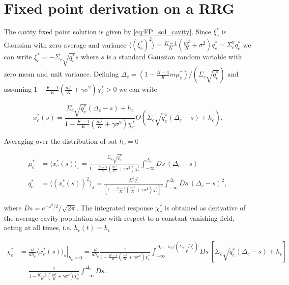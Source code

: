 \documentclass[
    preprint,
    linenumbers,
    amsmath,amssymb,amsfonts,
    aps, physrev,
    superscriptaddress,
    10pt,
    bibnotes
    ]{revtex4-2}
\begin{document}
\section{\label{sec:FP_RRG}Fixed point derivation on a RRG}

The cavity fixed point solution is given by \eqref{eq:FP_sol_cavity}.
Since $\xi_{c}^{*}$ is Gaussian with zero average and variance $\langle\left(\xi_{c}^{*}\right)^{2}\rangle=\frac{K-1}{K}\left(\frac{m^{2}}{K}+\sigma^{2}\right)q_{c}^{*}=\Sigma_{c}^{2}q_{c}^{*}$
we can write $\xi_{c}^{*}=-\Sigma_{c}\sqrt{q_{c}^{*}}s$ where $s$
is a standard Gaussian random variable with zero mean and unit variance.
Defining $\Delta_{c}=\left(1-\frac{K-1}{K}m\mu_{c}^{*}\right)/\left(\Sigma_{c}\sqrt{q_{c}^{*}}\right)$
and assuming $1-\frac{K-1}{K}(\frac{m^{2}}{K}+\gamma\sigma^{2})\chi_{c}^{*}>0$
we can write

\begin{equation}
x_{c}^{*}(s)=\frac{\Sigma_{c}\sqrt{q_{c}^{*}}\left(\Delta_{c}-s\right)+h_{c}}{1-\frac{K-1}{K}(\frac{m^{2}}{K}+\gamma\sigma^{2})\chi_{c}^{*}}\Theta\left(\Sigma_{c}\sqrt{q_{c}^{*}}\left(\Delta_{c}-s\right)+h_{c}\right).
\end{equation}

Averaging over the distribution of $s$at $h_{c}=0$

\begin{subequations}
\begin{align}
\mu_{c}^{*} & =\langle x_{c}^{*}(s)\rangle_{s}=\frac{\Sigma_{c}\sqrt{q_{c}^{*}}}{1-\frac{K-1}{K}\left(\frac{m^{2}}{K}+\gamma\sigma^{2}\right)\chi_{c}^{*}}\int_{-\infty}^{\Delta_{c}}Ds\:\left(\Delta_{c}-s\right)\\
q_{c}^{*} & =\langle\left(x_{c}^{*}(s)\right)^{2}\rangle_{s}=\frac{\Sigma_{c}^{2}q_{c}^{*}}{\left[1-\frac{K-1}{K}\left(\frac{m^{2}}{K}+\gamma\sigma^{2}\right)\chi_{c}^{*}\right]^{2}}\int_{-\infty}^{\Delta_{c}}Ds\:\left(\Delta_{c}-s\right)^{2},
\end{align}
\end{subequations}

where $Ds=e^{-s^{2}/2}/\sqrt{2\pi}$. The integrated response $\chi_{c}^{*}$
is obtained as derivative of the average cavity population size with
respect to a constant vanishing field, acting at all times, i.e. $h_{c}(t)=h_{c}$

\begin{align}
\chi_{c}^{*} & =\left.\frac{d}{dh_{c}}\langle x_{c}^{*}(s)\rangle_{s}\right|_{h_{c}=0}=\frac{d}{dh_{c}}\frac{1}{1-\frac{K-1}{K}\left(\frac{m^{2}}{K}+\gamma\sigma^{2}\right)\chi_{c}^{*}}\int_{-\infty}^{\Delta_{c}+h_{c}/(\Sigma_{c}\sqrt{q_{c}^{*}})}Ds\:\left[\Sigma_{c}\sqrt{q_{c}^{*}}\left(\Delta_{c}-s\right)+h_{c}\right]\\
 & =\frac{1}{1-\frac{K-1}{K}\left(\frac{m^{2}}{K}+\gamma\sigma^{2}\right)\chi_{c}^{*}}\int_{-\infty}^{\Delta_{c}}Ds.
\end{align}
\end{document}
